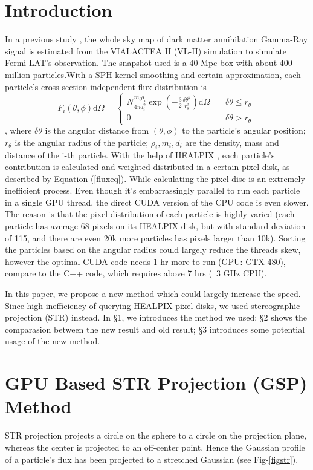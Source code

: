 \section*{Introduction}
In a previous study \citet{Kuhlen:2008kr}, the whole sky map of dark matter annihilation Gamma-Ray signal is estimated from the VIALACTEA II (VL-II) simulation to simulate Fermi-LAT's observation. The snapshot used is a 40 Mpc box with about 400 million particles.With a SPH kernel smoothing and certain approximation, each particle's cross section independent flux distribution is
\begin{equation}\label{fluxeq}
	F_i(\theta,\phi)\mathrm{d}\Omega = 
	\left\{\begin{aligned}
		N\frac{m_i\rho_i}{4\pi d_i^2} \exp\left(-\frac{3}2\frac{\delta\theta^2}{r_\theta^2}\right)\mathrm{d}\Omega  &\  & \delta\theta \le r_\theta \\
		0	&\   & \delta\theta > r_\theta\
	\end{aligned}\right.
\end{equation}
, where $\delta\theta$ is the angular distance from $(\theta, \phi)$ to the particle’s angular position; $r_\theta$ is the angular radius of the particle; $\rho_i, m_i, d_i$ are the density, mass and distance of the i-th particle. With the help of HEALPIX \citep{Gorski:2005ku}, each particle's contribution is calculated and weighted distributed in a certain pixel disk, as described by Equation (\ref{fluxeq}). While calculating the pixel disc is an extremely inefficient process. Even though it's embarrassingly parallel to run each particle in a single GPU thread, the direct CUDA version of the CPU code is even slower. The reason is that the pixel distribution of each particle is highly varied (each particle has average 68 pixels on its HEALPIX disk, but with standard deviation of 115, and there are even 20k more particles has pixels larger than 10k). Sorting the particles based on the angular radius could largely reduce the threads skew, however the optimal CUDA code needs 1 hr more to run (GPU: GTX 480), compare to the C++ code, which requires above 7 hrs (~3 GHz CPU). 

In this paper, we propose a new method which could largely increase the speed. Since high inefficiency of querying HEALPIX pixel disks, we used stereographic projection (STR) instead. In \S 1, we introduces the method we used; \S 2 shows the comparasion between the new result and old result; \S 3 introduces some potential usage of the new method.


\section{GPU Based STR Projection (GSP) Method}
STR projection projects a circle on the sphere to a circle on the projection plane, whereas the center is projected to an off-center point. Hence the Gaussian profile of a particle's flux has been projected to a stretched Gaussian (see Fig-\ref{figstr}). 

